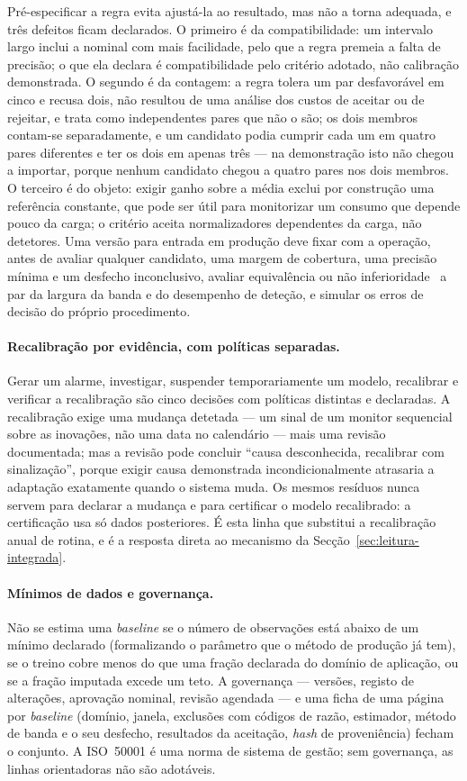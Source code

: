 Pré-especificar a regra evita ajustá-la ao resultado, mas não a torna
adequada, e três defeitos ficam declarados. O primeiro é da compatibilidade:
um intervalo largo inclui a nominal com mais facilidade, pelo que a regra
premeia a falta de precisão; o que ela declara é compatibilidade pelo
critério adotado, não calibração demonstrada. O segundo é da contagem: a
regra tolera um par desfavorável em cinco e recusa dois, não resultou de uma
análise dos custos de aceitar ou de rejeitar, e trata como independentes
pares que não o são; os dois membros contam-se separadamente, e um candidato
podia cumprir cada um em quatro pares diferentes e ter os dois em apenas
três --- na demonstração isto não chegou a importar, porque nenhum candidato
chegou a quatro pares nos dois membros. O terceiro é do objeto: exigir ganho
sobre a média exclui por construção uma referência constante, que pode ser
útil para monitorizar um consumo que depende pouco da carga; o critério
aceita normalizadores dependentes da carga, não detetores. Uma versão para
entrada em produção deve fixar com a operação, antes de avaliar qualquer
candidato, uma margem de cobertura, uma precisão mínima e um desfecho
inconclusivo, avaliar equivalência ou não inferioridade~\cite{Lakens2017} a
par da largura da banda e do desempenho de deteção, e simular os erros de
decisão do próprio procedimento.

\paragraph{Recalibração por evidência, com políticas separadas.} Gerar um
alarme, investigar, suspender temporariamente um modelo, recalibrar e
verificar a recalibração são cinco decisões com políticas distintas e
declaradas. A recalibração exige uma mudança detetada --- um sinal de um
monitor sequencial~\cite{Page1954,Lai1995} sobre as inovações, não uma data
no calendário --- mais
uma revisão documentada; mas a revisão pode concluir ``causa desconhecida,
recalibrar com sinalização'', porque exigir causa demonstrada
incondicionalmente atrasaria a adaptação exatamente quando o sistema muda.
Os mesmos resíduos nunca servem para declarar a mudança e para certificar o
modelo recalibrado: a certificação usa só dados posteriores. É esta linha
que substitui a recalibração anual de rotina, e é a resposta direta ao
mecanismo da Secção~\ref{sec:leitura-integrada}.

\paragraph{Mínimos de dados e governança.} Não se estima uma \emph{baseline}
se o número de observações está abaixo de um mínimo declarado (formalizando
o parâmetro que o método de produção já tem), se o treino cobre menos do que
uma fração declarada do domínio de aplicação, ou se a fração imputada excede
um teto. A governança --- versões, registo de alterações, aprovação nominal,
revisão agendada --- e uma ficha de uma página por \emph{baseline} (domínio,
janela, exclusões com códigos de razão, estimador, método de banda e o seu
desfecho, resultados da aceitação, \emph{hash} de proveniência) fecham o
conjunto. A ISO~50001 é uma norma de sistema de gestão; sem governança, as
linhas orientadoras não são adotáveis.


